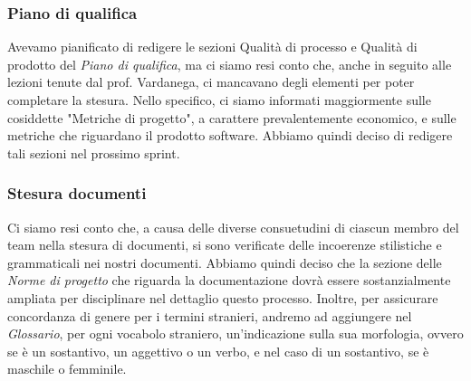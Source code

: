         \subsubsection{Piano di qualifica}
            Avevamo pianificato di redigere le sezioni Qualità di processo e Qualità di prodotto 
            del \textit{Piano di qualifica}, ma ci siamo resi conto che, anche in seguito alle
            lezioni tenute dal prof. Vardanega, ci mancavano degli elementi per poter completare
            la stesura. Nello specifico, ci siamo informati maggiormente sulle cosiddette
            "Metriche di progetto", a carattere prevalentemente economico, e sulle metriche
            che riguardano il prodotto software.
            Abbiamo quindi deciso di redigere tali sezioni nel prossimo sprint.
        \subsubsection{Stesura documenti}
            Ci siamo resi conto che, a causa delle diverse consuetudini di ciascun membro del team 
            nella stesura di documenti, si sono verificate delle incoerenze stilistiche e grammaticali nei nostri
            documenti. Abbiamo quindi deciso che la sezione delle \textit{Norme di progetto} che 
            riguarda la documentazione dovrà essere sostanzialmente ampliata per disciplinare 
            nel dettaglio questo processo. Inoltre, per assicurare concordanza di genere per i 
            termini stranieri, andremo ad aggiungere nel \textit{Glossario}, per ogni vocabolo
            straniero, un'indicazione sulla sua morfologia, ovvero se è un sostantivo,
            un aggettivo o un verbo, e nel caso di un sostantivo, se è maschile o femminile.
            
